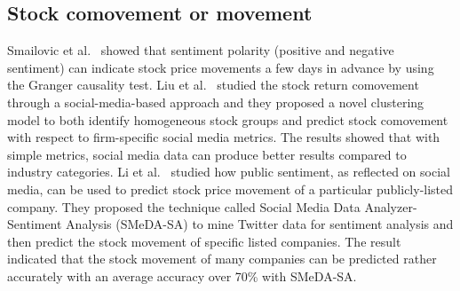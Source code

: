 \documentclass[review,3p,times,12pt,number]{elsarticle}
\begin{document}
\subsection{Stock comovement or movement}
Smailovic et al.~\cite{Smailovi2013Predictive} showed that sentiment polarity (positive and negative sentiment) can indicate stock price movements a few days in advance by using the Granger causality test.
Liu et al.~\cite{Liu2015A} studied the stock return comovement through a social-media-based approach and they proposed a novel clustering model to both identify homogeneous stock groups and predict stock comovement with respect to firm-specific social media metrics. The results showed that with simple metrics, social media data can produce better results compared to industry categories.
Li et al.~\cite{Li2017Discovering} studied how public sentiment, as reflected on social media, can be used to predict stock price movement of a particular publicly-listed company. They proposed the technique called Social Media Data Analyzer-Sentiment Analysis (SMeDA-SA) to mine Twitter data for sentiment analysis and then predict the stock movement of specific listed companies. The result indicated that the stock movement of many companies can be predicted rather accurately with an average accuracy over 70\% with SMeDA-SA.
\end{document}
